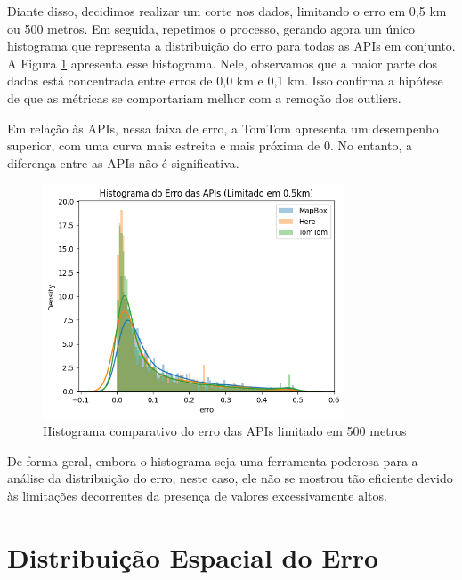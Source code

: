 Diante disso, decidimos realizar um corte nos dados, limitando o erro em 0,5 km ou 500 metros. Em seguida, repetimos o processo, gerando agora um único histograma que representa a distribuição do erro para todas as APIs em conjunto. A Figura \ref{fig:histLimitado} apresenta esse histograma. Nele, observamos que a maior parte dos dados está concentrada entre erros de 0,0 km e 0,1 km. Isso confirma a hipótese de que as métricas se comportariam melhor com a remoção dos outliers.

Em relação às APIs, nessa faixa de erro, a TomTom apresenta um desempenho superior, com uma curva mais estreita e mais próxima de 0. No entanto, a diferença entre as APIs não é significativa.

 
\begin{figure}[h]
  \centering
  \includegraphics[width=0.8\textwidth]{Figuras/hist5.png}
  \caption{Histograma comparativo do erro das APIs limitado em 500 metros}
  \label{fig:histLimitado}
\end{figure}

De forma geral, embora o histograma seja uma ferramenta poderosa para a análise da distribuição do erro, neste caso, ele não se mostrou tão eficiente devido às limitações decorrentes da presença de valores excessivamente altos.


\section{Distribuição Espacial do Erro}

